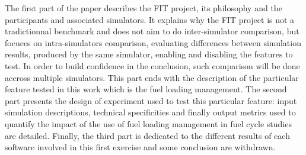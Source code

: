The first part of the paper describes the FIT project, its philosophy and the
participants and associated simulators. It explains why the FIT project is not a
tradictionnal benchmark and does not aim to do inter-simulator comparison, but
focuces on intra-simulators comparison, evaluating differences between
simulation results, produced by the same simulator, enabling and disabling  the
features to test. In order to build confidence in the conclusion, such
comparison will be done accross multiple simulators. This part ends with the
description of the particular feature tested in this work which is the fuel
loading management. The second part presents the design of experiment used to
test this particular feature: input simulation descriptions, technical
specificities and finally output metrics used to quantify the impact of the use
of fuel loading management in fuel cycle studies are detailed. Finally, the
third part is dedicated to the different results of each software involved in
this first exercise and some conclusion are withdrawn.
